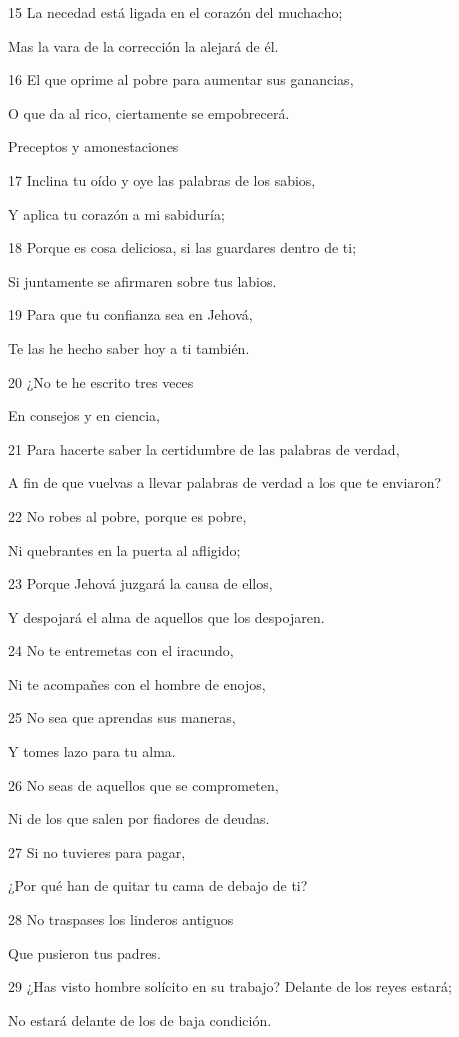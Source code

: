 \par 15 La necedad está ligada en el corazón del muchacho;
\par Mas la vara de la corrección la alejará de él.
\par 16 El que oprime al pobre para aumentar sus ganancias, 
\par O que da al rico, ciertamente se empobrecerá.
\par Preceptos y amonestaciones
\par 17 Inclina tu oído y oye las palabras de los sabios,
\par Y aplica tu corazón a mi sabiduría;
\par 18 Porque es cosa deliciosa, si las guardares dentro de ti;
\par Si juntamente se afirmaren sobre tus labios.
\par 19 Para que tu confianza sea en Jehová,
\par Te las he hecho saber hoy a ti también.
\par 20 ¿No te he escrito tres veces
\par En consejos y en ciencia,
\par 21 Para hacerte saber la certidumbre de las palabras de verdad,
\par A fin de que vuelvas a llevar palabras de verdad a los que te enviaron?
\par 22 No robes al pobre, porque es pobre,
\par Ni quebrantes en la puerta al afligido;
\par 23 Porque Jehová juzgará la causa de ellos,
\par Y despojará el alma de aquellos que los despojaren.
\par 24 No te entremetas con el iracundo,
\par Ni te acompañes con el hombre de enojos,
\par 25 No sea que aprendas sus maneras,
\par Y tomes lazo para tu alma.
\par 26 No seas de aquellos que se comprometen,
\par Ni de los que salen por fiadores de deudas.
\par 27 Si no tuvieres para pagar,
\par ¿Por qué han de quitar tu cama de debajo de ti?
\par 28 No traspases los linderos antiguos
\par Que pusieron tus padres.
\par 29 ¿Has visto hombre solícito en su trabajo? Delante de los reyes estará;
\par No estará delante de los de baja condición.

